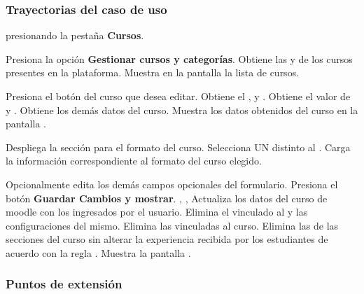 \clearpage
\subsubsection{Trayectorias del caso de uso}

\begin{UCtrayectoria}%
%
  presionando la pestaña {\bf Cursos}.

  \Actor Presiona la opción {\bf Gestionar cursos y categorías}.
  \Sistema Obtiene las  y
            de los cursos presentes en la plataforma.
  \Sistema Muestra en la pantalla  la lista de cursos.
           \label{CU-E05-course-list}

  \Actor Presiona el botón \IUConfigurar del curso que desea editar.
  \Sistema Obtiene el ,  y
           .
  \Sistema Obtiene el valor de  y
           . 
  \Sistema Obtiene los demás datos del curso.
  \Sistema Muestra los datos obtenidos del curso en la pantalla .

  \Actor Despliega la sección para el formato del curso.
  \Actor Selecciona UN  distinto al
         .
  \Sistema Carga la información correspondiente al formato del curso elegido.

  \Actor Opcionalmente edita los demás campos opcionales del formulario.
  \Actor Presiona el botón {\bf Guardar Cambios y mostrar}. , ,
          \label{CU-E05-submit}
  \Sistema Actualiza los datos del curso de moodle con los ingresados por el usuario.
  \Sistema Elimina el  vinculado al  y las
           configuraciones del mismo.
  \Sistema Elimina las  vinculadas al curso.
  \Sistema Elimina las  de las secciones del
           curso sin alterar la experiencia recibida por los estudiantes de acuerdo con
           la regla .
  \Sistema Muestra la pantalla .

\end{UCtrayectoria}


\subsubsection{Puntos de extensión}


